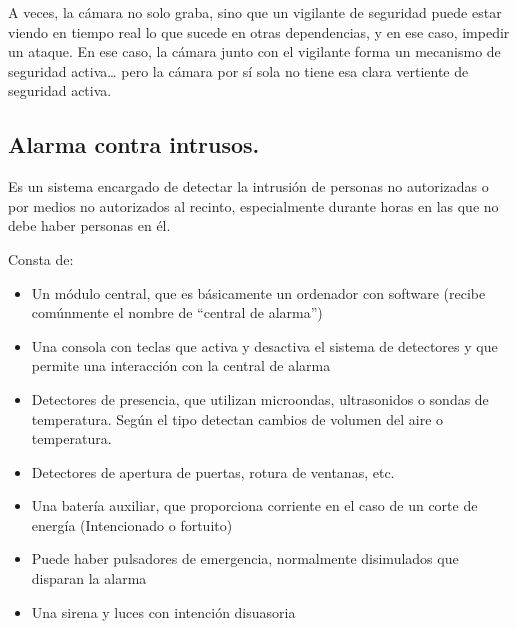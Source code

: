 \documentclass{article}
\begin{document}
A veces, la cámara no solo graba, sino que un vigilante de seguridad puede estar viendo en tiempo real lo que sucede en otras dependencias, y en ese caso, impedir un ataque. En ese caso, la cámara junto con el vigilante forma un mecanismo de seguridad activa\ldots{} pero la cámara por sí sola no tiene esa clara vertiente de seguridad activa.





\subsection{Alarma contra intrusos.}
\label{sec:org7f5baae}
Es un sistema encargado de detectar la intrusión de personas no autorizadas o por medios no autorizados al recinto, especialmente durante horas en las que no debe haber personas en él.



Consta de:
\begin{itemize}
\item Un módulo central, que es básicamente un ordenador con software (recibe comúnmente el nombre de “central de alarma”)
\item Una consola con teclas que activa y desactiva el sistema de detectores y que permite una interacción con la central de alarma
\item Detectores de presencia, que utilizan microondas, ultrasonidos o sondas de temperatura. Según el tipo detectan cambios de volumen del aire o temperatura.
\item Detectores de apertura de puertas, rotura de ventanas, etc.
\item Una batería auxiliar, que proporciona corriente en el caso de un corte de energía (Intencionado o fortuito)
\item Puede haber pulsadores de emergencia, normalmente disimulados que disparan la alarma
\item Una sirena y luces con intención disuasoria
\end{itemize}
\end{document}
